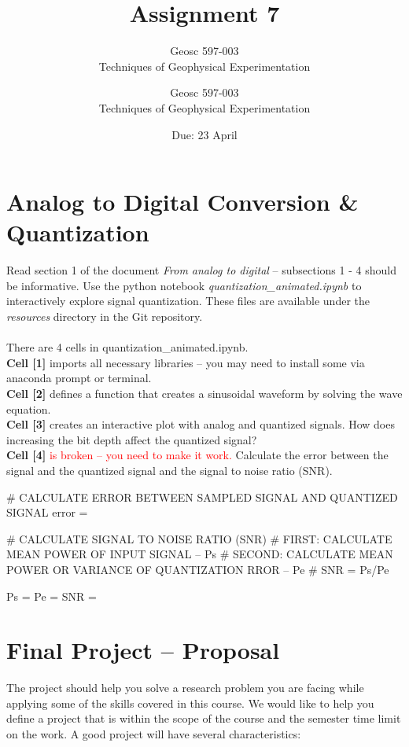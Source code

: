 \documentclass[10pt]{article}
\title{Assignment #1} %
\author{Geosc 597-003 \\
		Techniques of Geophysical Experimentation} %
\date{Due: #2}
\newcommand{\titler}[2]{
	\title{Assignment #1} %
	\author{Geosc 597-003 \\
		Techniques of Geophysical Experimentation} %
	\date{Due: #2}
	
	\maketitle}
\begin{document}

\titler{7}{23 April}

\section*{Analog to Digital Conversion \& Quantization}

Read section 1 of the document \textit{From analog to digital} -- subsections 1 - 4 should be informative. Use the python notebook\textit{ quantization\_animated.ipynb} to interactively explore signal quantization. These files are available under the \textit{resources} directory in the Git repository. \\ \\
There are 4 cells in quantization\_animated.ipynb. \\
\textbf{Cell [1]} imports all necessary libraries -- you may need to install some  via anaconda prompt or terminal. \\
\textbf{Cell [2]} defines a function that creates a sinusoidal waveform by solving the wave equation.\\
\textbf{Cell [3]} creates an interactive plot with analog and quantized signals. How does increasing the bit depth affect the quantized signal? \\
\textbf{Cell [4]} \textcolor{red}{is broken -- you need to make it work.} Calculate the error between the signal and the quantized signal and the signal to noise ratio (SNR).
\begin{python}
# CALCULATE ERROR BETWEEN SAMPLED SIGNAL AND QUANTIZED SIGNAL
error = 

# CALCULATE SIGNAL TO NOISE RATIO (SNR)
# FIRST: CALCULATE MEAN POWER OF INPUT SIGNAL -- Ps
# SECOND: CALCULATE MEAN POWER OR VARIANCE OF QUANTIZATION RROR -- Pe
# SNR = Ps/Pe

Ps = 
Pe = 
SNR = 
\end{python}


\section*{Final Project -- Proposal}
The project should help you solve a research problem you are facing while applying some of the skills covered in this course. We would like to help you define a project that is within the scope of the course and the semester time limit on the work. A good project will have several characteristics:
\end{document}
